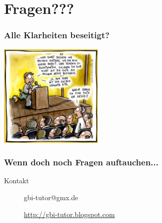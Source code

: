 \section[???]{Fragen???}
\begin{frame}
		\frametitle{Alle Klarheiten beseitigt?}
		\begin{center}
			\includegraphics[height=5cm]{comics/fragen.jpg}\\
		\end{center}
\end{frame}

\begin{frame}
	\frametitle{Wenn doch noch Fragen auftauchen...}
	        \begin{block}{Kontakt}
                \begin{description}
                        \item[] gbi-tutor@gmx.de
                        \item[] \url{http://gbi-tutor.blogspot.com}
                \end{description}
        \end{block}
\end{frame}


